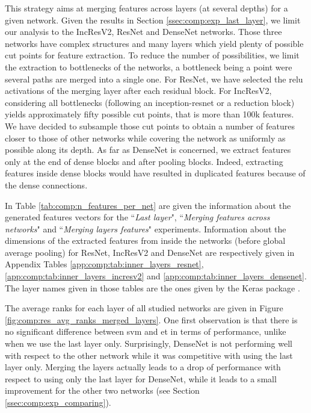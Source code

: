 This strategy aims at merging features across layers (at several depths) for a given network. Given the results in Section \ref{ssec:comp:exp_last_layer}, we limit our analysis to the IncResV2, ResNet and DenseNet networks. Those three networks have complex structures and many layers which yield plenty of possible cut points for feature extraction. To reduce the number of possibilities, we limit the extraction to bottlenecks of the networks, a bottleneck being a point were several paths are merged into a single one. For ResNet, we have selected the \acrshort{relu} activations of the merging layer after each residual block. For IncResV2, considering all bottlenecks (following an inception-resnet or a reduction block) yields approximately fifty possible cut points, that is more than 100k features. We have decided to subsample those cut points to obtain a number of features closer to those of other networks while covering the network as uniformly as possible along its depth. As far as DenseNet is concerned, we extract features only at the end of dense blocks and after pooling blocks. Indeed, extracting features inside dense blocks would have resulted in duplicated features because of the dense connections.  

In Table \ref{tab:comp:n_features_per_net} are given the information about the generated features vectors for the ``\textit{Last layer}", ``\textit{Merging features across networks}" and ``\textit{Merging layers features}" experiments. Information about the dimensions of the extracted features from inside the networks (before global average pooling) for ResNet, IncResV2 and DenseNet are respectively given in Appendix Tables \ref{app:comp:tab:inner_layers_resnet}, \ref{app:comp:tab:inner_layers_incresv2} and \ref{app:comp:tab:inner_layers_densenet}. The layer names given in those tables are the ones given by the Keras package \cite{chollet2015keras}. 

The average ranks for each layer of all studied networks are given in Figure \ref{fig:comp:res_avg_ranks_merged_layers}. One first observation is that there is no significant difference between \acrshort{svm} and \acrshort{et} in terms of performance, unlike when we use the last layer only. Surprisingly, DenseNet is not performing well with respect to the other network while it was competitive with using the last layer only. Merging the layers actually leads to a drop of performance with respect to using only the last layer for DenseNet, while it leads to a small improvement for the other two networks (see Section \ref{ssec:comp:exp_comparing}).

